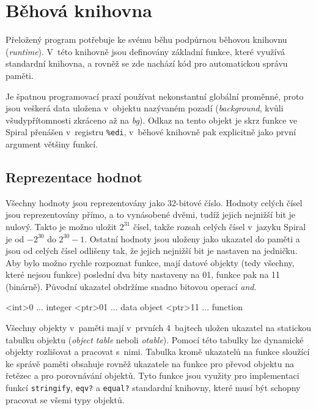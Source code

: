 \chapter{Běhová knihovna}

Přeložený program potřebuje ke svému běhu podpůrnou běhovou knihovnu
(\emph{runtime}). V~této knihovně jsou definovány základní funkce, které využívá
standardní knihovna, a rovněž se zde nachází kód pro automatickou správu paměti.

Je špatnou programovací praxí používat nekonstantní globální proměnné, proto
jsou veškerá  data uložena v~objektu nazývaném pozadí
(\emph{background}, kvůli všudypřítomnosti zkráceno až na \emph{bg}). Odkaz na
tento objekt je skrz funkce ve Spiral přenášen v~registru \texttt{\%edi},
v~běhové knihovně pak explicitně jako první argument většiny funkcí.

\section{Reprezentace hodnot}

Všechny hodnoty jsou reprezentovány jako 32-bitové číslo. Hodnoty celých čísel
jsou reprezentovány přímo, a to vynásobené dvěmi, tudíž jejich nejnižší bit je
nulový. Takto je možno uložit $2^{31}$ čísel, takže rozsah celých čísel v~jazyku
Spiral je od $-2^{30}$ do $2^{30}-1$. Ostatní hodnoty jsou uloženy jako ukazatel
do paměti a jsou od celých čísel odlišeny tak, že jejich nejnižší bit je
nastaven na jedničku. Aby bylo možno rychle rozpoznat funkce, mají datové
objekty (tedy všechny, které nejsou funkce) poslední dva bity nastaveny na 01,
funkce pak na 11 (binárně). Původní ukazatel obdržíme snadno bitovou operací
\emph{and}.

\begin{ttcode}
   <int>0 ... integer
  <ptr>01 ... data object
  <ptr>11 ... function
\end{ttcode}

Všechny objekty v~paměti mají v~prvních 4~bajtech uložen ukazatel na statickou
tabulku objektu (\emph{object table} neboli \emph{otable}). Pomocí této tabulky
lze dynamické objekty rozlišovat a pracovat s~nimi. Tabulka kromě ukazatelů na
funkce sloužící ke správě paměti obsahuje rovněž ukazatele na funkce pro převod
objektu na řetězec a pro porovnávání objektů. Tyto funkce jsou využity pro
implementaci funkcí \texttt{stringify}, \texttt{eqv?} a \texttt{equal?}
standardní knihovny, které musí být schopny pracovat se všemi typy objektů.

